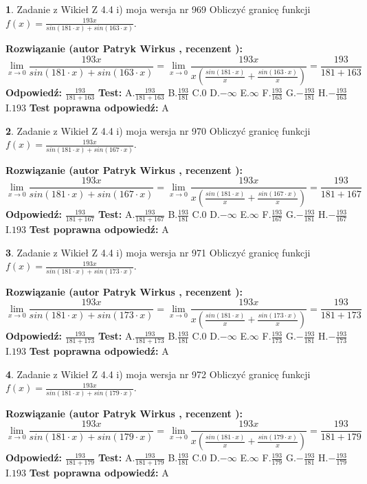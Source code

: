 \documentclass[12pt, a4paper]{article}
\theoremstyle{definition} %
\newtheorem{zad}{}
\newcommand{\zadStart}[1]{\begin{zad}#1\newline}
\newcommand{\zadStop}{\end{zad}}
\newcommand{\rozwStart}[2]{\noindent \textbf{Rozwiązanie (autor #1 , recenzent #2): }\newline}
\newcommand{\rozwStop}{\newline}
\newcommand{\odpStart}{\noindent \textbf{Odpowiedź:}\newline}
\newcommand{\odpStop}{\newline}
\newcommand{\testStart}{\noindent \textbf{Test:}\newline}
\newcommand{\testStop}{\newline}
\newcommand{\kluczStart}{\noindent \textbf{Test poprawna odpowiedź:}\newline}
\newcommand{\kluczStop}{\newline}
\begin{document}
\zadStart{Zadanie z Wikieł Z 4.4 i) moja wersja nr 969}
Obliczyć granicę funkcji $f(x)=\frac{193x}{sin(181\cdot x) +sin(163\cdot x)}$.
\zadStop
\rozwStart{Patryk Wirkus}{}
$$\lim\limits_{x\to 0}\frac{193x}{sin(181\cdot x) +sin(163\cdot x)}=\lim\limits_{x\to 0}\frac{193x}{x(\frac{sin(181\cdot x)}{x}+\frac{sin(163\cdot x)}{x})}=\frac{193}{181+163}$$
\rozwStop
\odpStart
$\frac{193}{181+163}$
\odpStop
\testStart
A.$\frac{193}{181+163}$
B.$\frac{193}{181}$
C.$0$
D.$-\infty$
E.$\infty$
F.$\frac{193}{163}$
G.$-\frac{193}{181}$
H.$-\frac{193}{163}$
I.$193$
\testStop
\kluczStart
A
\kluczStop



\zadStart{Zadanie z Wikieł Z 4.4 i) moja wersja nr 970}
Obliczyć granicę funkcji $f(x)=\frac{193x}{sin(181\cdot x) +sin(167\cdot x)}$.
\zadStop
\rozwStart{Patryk Wirkus}{}
$$\lim\limits_{x\to 0}\frac{193x}{sin(181\cdot x) +sin(167\cdot x)}=\lim\limits_{x\to 0}\frac{193x}{x(\frac{sin(181\cdot x)}{x}+\frac{sin(167\cdot x)}{x})}=\frac{193}{181+167}$$
\rozwStop
\odpStart
$\frac{193}{181+167}$
\odpStop
\testStart
A.$\frac{193}{181+167}$
B.$\frac{193}{181}$
C.$0$
D.$-\infty$
E.$\infty$
F.$\frac{193}{167}$
G.$-\frac{193}{181}$
H.$-\frac{193}{167}$
I.$193$
\testStop
\kluczStart
A
\kluczStop



\zadStart{Zadanie z Wikieł Z 4.4 i) moja wersja nr 971}
Obliczyć granicę funkcji $f(x)=\frac{193x}{sin(181\cdot x) +sin(173\cdot x)}$.
\zadStop
\rozwStart{Patryk Wirkus}{}
$$\lim\limits_{x\to 0}\frac{193x}{sin(181\cdot x) +sin(173\cdot x)}=\lim\limits_{x\to 0}\frac{193x}{x(\frac{sin(181\cdot x)}{x}+\frac{sin(173\cdot x)}{x})}=\frac{193}{181+173}$$
\rozwStop
\odpStart
$\frac{193}{181+173}$
\odpStop
\testStart
A.$\frac{193}{181+173}$
B.$\frac{193}{181}$
C.$0$
D.$-\infty$
E.$\infty$
F.$\frac{193}{173}$
G.$-\frac{193}{181}$
H.$-\frac{193}{173}$
I.$193$
\testStop
\kluczStart
A
\kluczStop



\zadStart{Zadanie z Wikieł Z 4.4 i) moja wersja nr 972}
Obliczyć granicę funkcji $f(x)=\frac{193x}{sin(181\cdot x) +sin(179\cdot x)}$.
\zadStop
\rozwStart{Patryk Wirkus}{}
$$\lim\limits_{x\to 0}\frac{193x}{sin(181\cdot x) +sin(179\cdot x)}=\lim\limits_{x\to 0}\frac{193x}{x(\frac{sin(181\cdot x)}{x}+\frac{sin(179\cdot x)}{x})}=\frac{193}{181+179}$$
\rozwStop
\odpStart
$\frac{193}{181+179}$
\odpStop
\testStart
A.$\frac{193}{181+179}$
B.$\frac{193}{181}$
C.$0$
D.$-\infty$
E.$\infty$
F.$\frac{193}{179}$
G.$-\frac{193}{181}$
H.$-\frac{193}{179}$
I.$193$
\testStop
\kluczStart
A
\kluczStop
\end{document}
